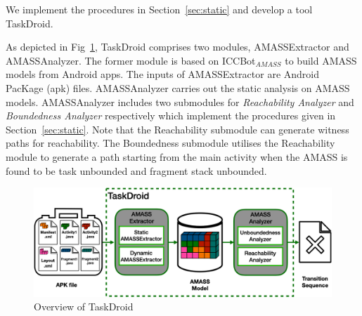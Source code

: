 We implement the procedures in Section~\ref{sec:static} and develop a tool TaskDroid.

As depicted in Fig~\ref{fig:taskdroid}, TaskDroid comprises two modules, {\sf AMASSExtractor} and {\sf AMASSAnalyzer}.  The former module is based on ICCBot$_{AMASS}$ to build AMASS models from Android apps. The inputs of {\sf AMASSExtractor} are Android PacKage (apk)  files.
{\sf AMASSAnalyzer}  carries out the static analysis on AMASS models. {\sf AMASSAnalyzer} includes two submodules for \emph{Reachability Analyzer} and \emph{Boundedness Analyzer} 
respectively which implement the procedures given in Section~\ref{sec:static}.  Note that the Reachability submodule  %
can generate witness paths for reachability.  
The Boundedness submodule %
utilises the Reachability module to generate a path starting from the main activity when the AMASS is found to be task unbounded and fragment stack unbounded.

\begin{figure}[h]
\centering
\includegraphics[scale=0.25]{taskdroid.png}
\caption{Overview of TaskDroid}
\label{fig:taskdroid}
\end{figure}
